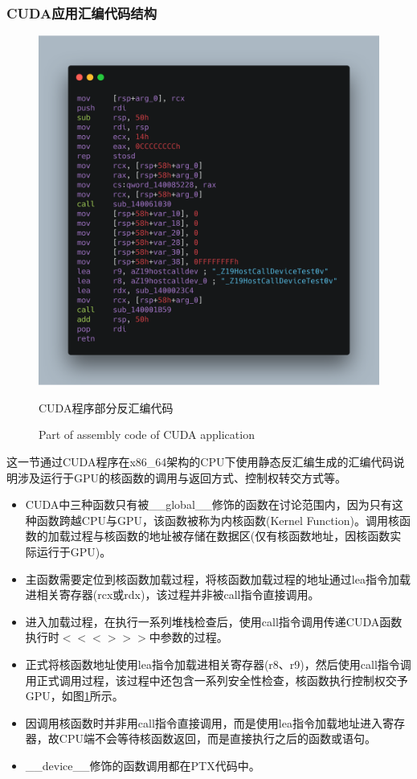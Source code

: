 \subsubsection{CUDA应用汇编代码结构}
\begin{figure}
	\centering
	\includegraphics[width=15cm]{figures/CODE4.png}
	\renewcommand{\thefigure}{\arabic{section}-\arabic{figure} }
	\renewcommand{\figurename}{图}
	\caption{CUDA程序部分反汇编代码}
	\addtocounter{figure}{-1}
	\renewcommand{\thefigure}{\arabic{section}-\arabic{figure} }
	\renewcommand{\figurename}{Figure}
	\caption{Part of assembly code of CUDA application}
	\label{Fig.CUDA-Assembly}
\end{figure}
\par 这一节通过CUDA程序在x86\_64架构的CPU下使用静态反汇编生成的汇编代码说明涉及运行于GPU的核函数的调用与返回方式、控制权转交方式等。
\begin{itemize}
\item CUDA中三种函数只有被\_\_global\_\_修饰的函数在讨论范围内，因为只有这种函数跨越CPU与GPU，该函数被称为内核函数(Kernel Function)。调用核函数的加载过程与核函数的地址被存储在数据区(仅有核函数地址，因核函数实际运行于GPU)。
\item 主函数需要定位到核函数加载过程，将核函数加载过程的地址通过lea指令加载进相关寄存器(rcx或rdx)，该过程并非被call指令直接调用。
\item 进入加载过程，在执行一系列堆栈检查后，使用call指令调用传递CUDA函数执行时$ <<< >>> $中参数的过程。
\item 正式将核函数地址使用lea指令加载进相关寄存器(r8、r9)，然后使用call指令调用正式调用过程，该过程中还包含一系列安全性检查，核函数执行控制权交予GPU，如图\ref{Fig.CUDA-Assembly}所示。
\item 因调用核函数时并非用call指令直接调用，而是使用lea指令加载地址进入寄存器，故CPU端不会等待核函数返回，而是直接执行之后的函数或语句。
\item \_\_device\_\_修饰的函数调用都在PTX代码中。
\end{itemize}

